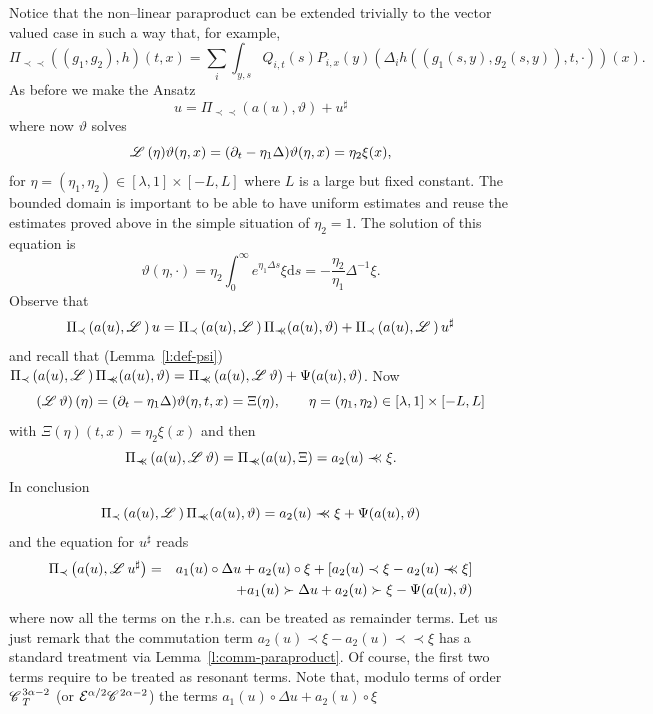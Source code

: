 \documentclass[11pt,reqno]{amsart}
\newcommand{\mathd}{\mathrm{d}}
\newcommand{\precprec}{\prec\!\!\!\prec}
\newcommand{\CC}{\mathscr{C} \hspace{.1em}}
\newcommand{\LL}{\mathscr{L} \hspace{.2em}}
\begin{document}
Notice that the non--linear paraproduct can be extended trivially to the
vector valued case in such a way that, for example,
\[ \Pi_{\precprec} ((g_1, g_2), h) (t, x) = \sum_i \int_{y, s} Q_{i, t} (s)
   P_{i, x} (y) (\Delta_i h ((g_1 (s, y), g_2 (s, y)), t, \cdot)) (x) . \]
As before we make the Ansatz
\[ u = \Pi_{\precprec} (a (u), \vartheta) + u^{\sharp} \]
where now $\vartheta$ solves
\[ \LL (\eta) \vartheta (\eta, x) = (\partial_t - \eta_1 \Delta) \vartheta
   (\eta, x) = \eta_2 \xi (x), \]
for $\eta = (\eta_1, \eta_2) \in [\lambda, 1] \times [- L, L]$ where $L$ is a
large but fixed constant. The bounded domain is important to be able to have
uniform estimates and reuse the estimates proved above in the simple situation
of $\eta_2 = 1$. The solution of this equation is
\[ \vartheta (\eta, \cdot) = \eta_2 \int_0^{\infty} e^{\eta_1 \Delta s} \xi
   \mathd s = - \frac{\eta_2}{\eta_1} \Delta^{- 1} \xi . \]
Observe that
$$
\Pi_{\prec} \left( a (u), \LL \right) u = \Pi_{\prec} \left( a (u), \LL
   \right) \Pi_{\precprec} (a (u), \vartheta) + \Pi_{\prec} \left( a (u), \LL
   \right) u^{\sharp}
$$
and recall that (Lemma~\ref{l:def-psi}) $\Pi_{\prec} \left( a (u), \LL \right)
\Pi_{\precprec} (a (u), \vartheta) = \Pi_{\precprec} \left( a (u), \LL
\vartheta \right) + \Psi (a (u), \vartheta)$. Now
$$
\left( \LL \vartheta \right) (\eta) = (\partial_t - \eta_1 \Delta)
   \vartheta (\eta, t, x) = \Xi (\eta), \qquad \eta = (\eta_1, \eta_2) \in
   [\lambda, 1] \times [- L, L]
$$
with $\Xi (\eta) (t, x) = \eta_2 \xi (x)$ and then
\[ \Pi_{\precprec} \left( a (u), \LL \vartheta \right) = \Pi_{\precprec} (a
   (u), \Xi) = a_2 (u) \precprec \xi . \]
In conclusion
\[ \Pi_{\prec} \left( a (u), \LL \right) \Pi_{\precprec} (a (u), \vartheta) =
   a_2 (u) \precprec \xi + \Psi (a (u), \vartheta) \]
and the equation for $u^{\sharp}$ reads
\begin{eqnarray}
  \Pi_{\prec} \left( a (u), \LL u^{\sharp} \right) & = & a_1 (u) \circ \Delta
  u + a_2 (u) \circ \xi + [a_2 (u) \prec \xi - a_2 (u) \precprec \xi]
  \nonumber\\
  &  & + a_1 (u) \succ \Delta u + a_2 (u) \succ \xi - \Psi (a (u), \vartheta)
  \nonumber
\end{eqnarray}
where now all the terms on the r.h.s. can be treated as remainder terms. Let
us just remark that the commutation term $a_2 (u) \prec \xi - a_2 (u)
\precprec \xi$ has a standard treatment via Lemma~\ref{l:comm-paraproduct}. Of
course, the first two terms require to be treated as resonant terms. Note
that, modulo terms of order $\CC^{3 \alpha - 2}_T$ (or $\mathcal{E}^{\alpha /
2} \CC^{2 \alpha - 2}$) the terms $a_1 (u) \circ \Delta u + a_2 (u) \circ \xi$
\end{document}
